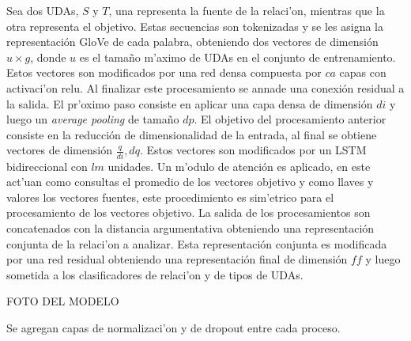 Sea dos UDAs, $S$ y $T$, una representa la fuente de la relaci'on, mientras que la otra representa
el objetivo. Estas secuencias son tokenizadas y se les asigna la representación GloVe de cada palabra, obteniendo
dos vectores de dimensión $u \times g$, donde $u$ es el tamaño m'aximo de UDAs en el conjunto de entrenamiento.
Estos vectores son modificados por una red densa compuesta por $ca$ capas con activaci'on relu. 
Al finalizar este procesamiento se annade una conexión residual
a la salida. El pr'oximo paso consiste en aplicar una capa densa de dimensión $di$ y luego un \emph{average pooling}
de tamaño $dp$. El objetivo del procesamiento anterior consiste
en la reducción de dimensionalidad de la entrada, al final se obtiene vectores de dimensión $\frac{q}{di}, dq$. 
Estos vectores son modificados por un LSTM bidireccional con $lm$ unidades. Un m'odulo de atención es aplicado, 
en este act'uan como consultas el promedio de los vectores objetivo y como llaves y valores los vectores fuentes,
este procedimiento es sim'etrico para el procesamiento de los vectores objetivo.
La salida de los procesamientos son concatenados con la distancia argumentativa obteniendo una representación 
conjunta de la relaci'on a analizar. Esta representación conjunta es modificada por una red residual obteniendo
una representación final de dimensión $ff$ y luego sometida a los clasificadores de relaci'on y de tipos de UDAs.

FOTO DEL MODELO

Se agregan capas de normalizaci'on y de dropout entre cada proceso.

